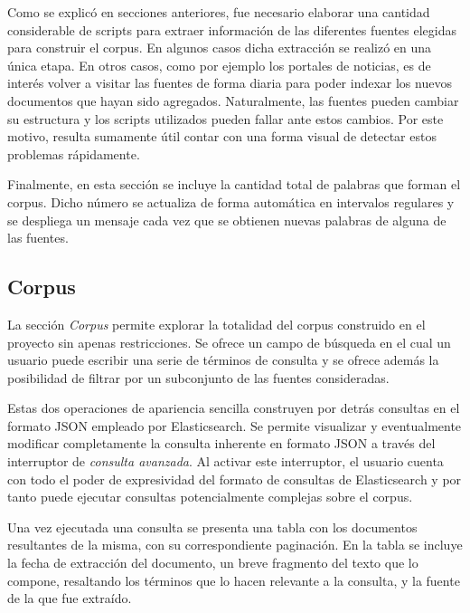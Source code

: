 Como se explicó en secciones anteriores, fue necesario elaborar una cantidad considerable de scripts para
extraer información de las diferentes fuentes elegidas para construir el corpus. En algunos casos dicha
extracción se realizó en una única etapa. En otros casos, como por ejemplo los portales de noticias, es de
interés volver a visitar las fuentes de forma diaria para poder indexar los nuevos documentos que hayan
sido agregados. Naturalmente, las fuentes pueden cambiar su estructura y los scripts utilizados pueden
fallar ante estos cambios. Por este motivo, resulta sumamente útil contar con una forma visual de detectar
estos problemas rápidamente.

Finalmente, en esta sección se incluye la cantidad total de palabras que forman el corpus. Dicho número se
actualiza de forma automática en intervalos regulares y se despliega un mensaje cada vez que se obtienen
nuevas palabras de alguna de las fuentes.

\subsection{Corpus}

La sección \textit{Corpus} permite explorar la totalidad del corpus construido en el proyecto sin apenas
restricciones. Se ofrece un campo de búsqueda en el cual un usuario puede escribir una serie de términos
de consulta y se ofrece además la posibilidad de filtrar por un subconjunto de las fuentes consideradas.

Estas dos operaciones de apariencia sencilla construyen por detrás consultas en el formato JSON empleado
por Elasticsearch. Se permite visualizar y eventualmente modificar completamente la consulta inherente en
formato JSON a través del interruptor de \textit{consulta avanzada}. Al activar este interruptor, el
usuario cuenta con todo el poder de expresividad del formato de consultas de Elasticsearch y por tanto
puede ejecutar consultas potencialmente complejas sobre el corpus.

Una vez ejecutada una consulta se presenta una tabla con los documentos resultantes de la misma, con su
correspondiente paginación. En la tabla se incluye la fecha de extracción del documento, un breve fragmento
del texto que lo compone, resaltando los términos que lo hacen relevante a la consulta, y la fuente de la
que fue extraído.

